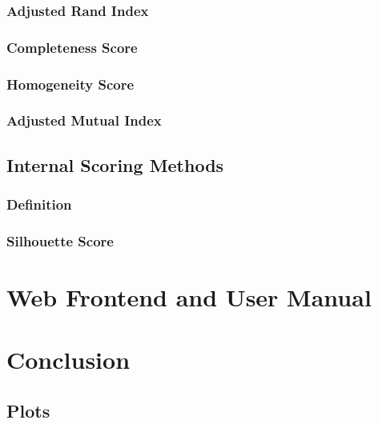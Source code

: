 \documentclass[12pt, english]
{article}
\begin{document}
\subsubsection{Adjusted Rand Index}

\subsubsection{Completeness Score}

\subsubsection{Homogeneity Score}

\subsubsection{Adjusted Mutual Index}

\subsection{Internal Scoring Methods}
\subsubsection{Definition}

\subsubsection{Silhouette Score}



\section{Web Frontend and User Manual}


\section{Conclusion}


\newpage

\printglossary[style=altlist,title=Glossary]
 
\printglossary[type=\acronymtype,style=long]
 

\newpage




\nocite{*}

\begin{appendices}
	\section{Plots}
	
\end{appendices}
\end{document}

